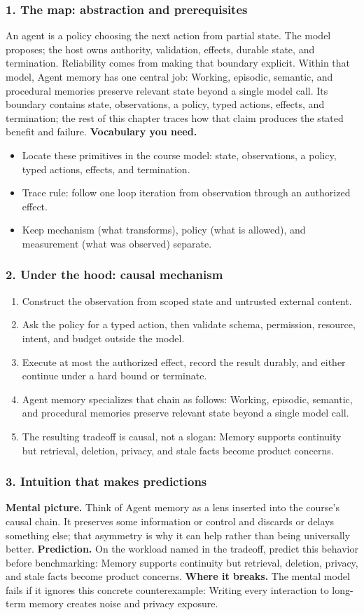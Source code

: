 \subsubsection*{1. The map: abstraction and prerequisites}
An agent is a policy choosing the next action from partial state. The model proposes; the host owns authority, validation, effects, durable state, and termination. Reliability comes from making that boundary explicit.
Within that model, Agent memory has one central job: Working, episodic, semantic, and procedural memories preserve relevant state beyond a single model call. Its boundary contains state, observations, a policy, typed actions, effects, and termination; the rest of this chapter traces how that claim produces the stated benefit and failure.
\textbf{Vocabulary you need.}\begin{itemize}
\item Locate these primitives in the course model: state, observations, a policy, typed actions, effects, and termination.
\item Trace rule: follow one loop iteration from observation through an authorized effect.
\item Keep mechanism (what transforms), policy (what is allowed), and measurement (what was observed) separate.
\end{itemize}
\subsubsection*{2. Under the hood: causal mechanism}\begin{enumerate}
\item Construct the observation from scoped state and untrusted external content.
\item Ask the policy for a typed action, then validate schema, permission, resource, intent, and budget outside the model.
\item Execute at most the authorized effect, record the result durably, and either continue under a hard bound or terminate.
\item Agent memory specializes that chain as follows: Working, episodic, semantic, and procedural memories preserve relevant state beyond a single model call.
\item The resulting tradeoff is causal, not a slogan: Memory supports continuity but retrieval, deletion, privacy, and stale facts become product concerns.
\end{enumerate}
\subsubsection*{3. Intuition that makes predictions}
\textbf{Mental picture.} Think of Agent memory as a lens inserted into the course's causal chain. It preserves some information or control and discards or delays something else; that asymmetry is why it can help rather than being universally better.
\textbf{Prediction.} On the workload named in the tradeoff, predict this behavior before benchmarking: Memory supports continuity but retrieval, deletion, privacy, and stale facts become product concerns.
\textbf{Where it breaks.} The mental model fails if it ignores this concrete counterexample: Writing every interaction to long-term memory creates noise and privacy exposure.
